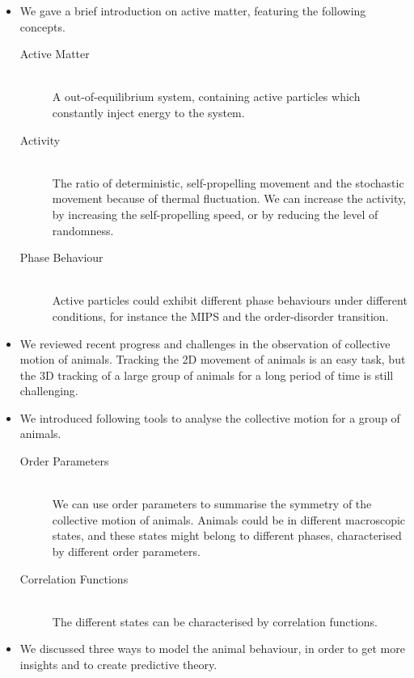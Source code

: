 \documentclass[11pt,twoside]{report}
\begin{document}
\begin{adjustwidth}{0cm}{-5cm}

\begin{tcolorbox}[
fonttitle=\sffamily\Large,
right=0.1\linewidth,
top=5mm,
bottom=5mm,
title=Summary of Chapter 2,
]

\begin{itemize}
	\item We gave a brief introduction on active matter, featuring the following concepts.
	\begin{description}
		\item[Active Matter] \hfill \\ 
		A out-of-equilibrium system, containing active particles which constantly inject energy to the system.
		\item[Activity] \hfill \\ 
		The ratio of deterministic, self-propelling movement and the stochastic movement because of thermal fluctuation. We can increase the activity, by increasing the self-propelling speed, or by reducing the level of randomness.
		\item[Phase Behaviour] \hfill \\
		Active particles could exhibit different phase behaviours under different conditions, for instance the MIPS and the order-disorder transition.
	\end{description}
	\item We reviewed recent progress and challenges in the observation of collective motion of animals. Tracking the 2D movement of animals is an easy task, but the 3D tracking of a large group of animals for a long period of time is still challenging.
	\item We introduced following tools to analyse the collective motion for a group of animals.
	\begin{description}
		\item[Order Parameters]\hfill \\ 
			We can use order parameters to summarise the symmetry of the collective motion of animals.
			Animals could be in different macroscopic states, and these states might belong to different phases, characterised by different order parameters.
		\item[Correlation Functions]\hfill \\
			The different states can be characterised by correlation functions.
	\end{description}
	\item We discussed three ways to model the animal behaviour, in order to get more insights and to create predictive theory.

\end{itemize}
\end{tcolorbox}
\end{adjustwidth}
\end{document}
